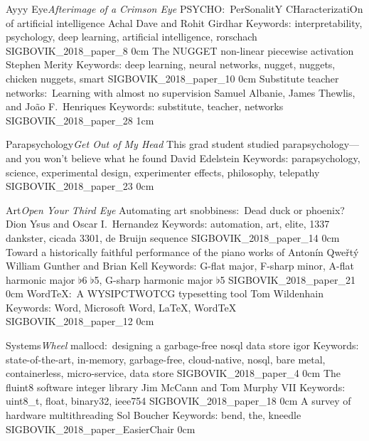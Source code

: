 \addtrack
	{Ayyy Eye}{\textit{Afterimage of a Crimson Eye}}
\addpaper
	{PSYCHO:\ PerSonalitY CHaracterizatiOn of artificial intelligence}
	{Achal Dave and Rohit Girdhar}
	{Keywords: interpretability, psychology, deep learning, artificial intelligence, rorschach}
	{SIGBOVIK_2018_paper_8}
	{0cm}
	{}
\addpaper
	{The NUGGET non-linear piecewise activation}
	{Stephen Merity}
	{Keywords: deep learning, neural networks, nugget, nuggets, chicken nuggets, smart}
	{SIGBOVIK_2018_paper_10}
	{0cm}
	{}
\addpaper
	{Substitute teacher networks:\ Learning with almost no supervision}
	{Samuel Albanie, James Thewlis, and Jo\~ao F.\ Henriques}
	{Keywords: substitute, teacher, networks}
	{SIGBOVIK_2018_paper_28}
	{1cm}
	{}

\addtrack
	{Parapsychology}{\textit{Get Out of My Head}}
\addpaper
	{This grad student studied parapsychology---and you won't believe what he found}
	{David Edelstein}
	{Keywords: parapsychology, science, experimental design, experimenter effects, philosophy, telepathy}
	{SIGBOVIK_2018_paper_23}
	{0cm}
	{}

\addtrack
	{Art}{\textit{Open Your Third Eye}}
\addpaper
	{Automating art snobbiness:\ Dead duck or phoenix?}
	{Dion Ysus and Oscar I.\ Hernandez}
	{Keywords: automation, art, elite, 1337 dankster, cicada 3301, de Bruijn sequence}
	{SIGBOVIK_2018_paper_14}
	{0cm}
	{}
\addpaper
	{Toward a historically faithful performance of the piano works of Anton\'in Qwe\v{r}t\'y}
	{William Gunther and Brian Kell}
	{Keywords: G-flat major, F-sharp minor, A-flat harmonic major $\flat$6 $\flat$5, G-sharp harmonic major $\flat$5}
	{SIGBOVIK_2018_paper_21}
	{0cm}
	{}
\addpaper
	{WordTeX:\ A WYSIPCTWOTCG typesetting tool}
	{Tom Wildenhain}
	{Keywords: Word, Microsoft Word, LaTeX, WordTeX}
	{SIGBOVIK_2018_paper_12}
	{0cm}
	{}


\addtrack
	{Systems}{\textit{Wheel}}
\addpaper
	{mallocd:\ designing a garbage-free nosql data store}
	{igor}
	{Keywords: state-of-the-art, in-memory, garbage-free, cloud-native, nosql, bare metal, containerless, micro-service, data store}
	{SIGBOVIK_2018_paper_4}
	{0cm}
	{}
\addpaper
	{The fluint8 software integer library}
	{Jim McCann and Tom Murphy VII}
	{Keywords: uint8\_t, float, binary32, ieee754}
	{SIGBOVIK_2018_paper_18}
	{0cm}
	{}
\addpaper
	{A survey of hardware multithreading}
	{Sol Boucher}
	{Keywords: bend, the, kneedle}
	{SIGBOVIK_2018_paper_EasierChair}
	{0cm}
	{}

